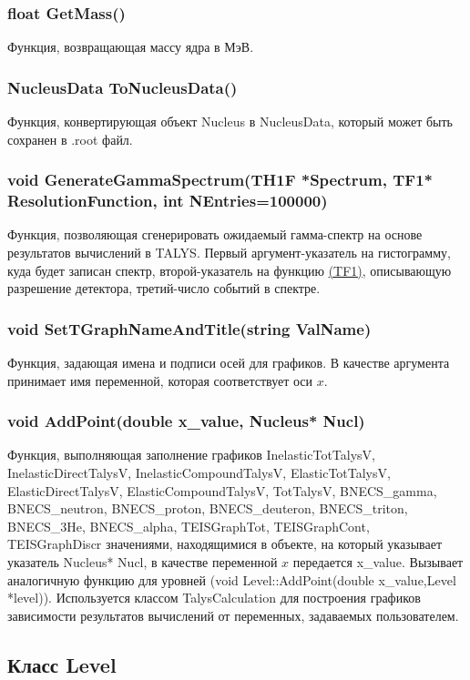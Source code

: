 \documentclass[a4paper,12pt]{extarticle}
\begin{document}
\subsubsection{float GetMass()}
Функция, возвращающая массу ядра в МэВ.
\subsubsection{NucleusData ToNucleusData()}
Функция, конвертирующая объект Nucleus в NucleusData, который может быть сохранен в .root файл.
\subsubsection{void GenerateGammaSpectrum(TH1F *Spectrum, TF1* ResolutionFunction, int NEntries=100000)}
Функция, позволяющая сгенерировать ожидаемый гамма-спектр на основе результатов вычислений в TALYS. Первый аргумент-указатель на гистограмму, куда будет записан спектр, второй-указатель на функцию \href{https://root.cern.ch/doc/master/classTF1.html}{(TF1)}, описывающую разрешение детектора, третий-число событий в спектре.
\subsubsection{void SetTGraphNameAndTitle(string ValName)}
Функция, задающая имена и подписи осей для графиков. В качестве аргумента принимает имя переменной, которая соответствует оси $x$.
\subsubsection{void AddPoint(double x_value, Nucleus* Nucl)}
Функция, выполняющая заполнение графиков InelasticTotTalysV, InelasticDirectTalysV, InelasticCompoundTalysV, ElasticTotTalysV, ElasticDirectTalysV, ElasticCompoundTalysV, TotTalysV, BNECS_gamma, BNECS_neutron, BNECS_proton, BNECS_deuteron, BNECS_triton, BNECS_3He, BNECS_alpha, TEISGraphTot, TEISGraphCont, TEISGraphDiscr значениями, находящимися в объекте, на который указывает указатель Nucleus* Nucl, в качестве переменной $x$ передается x_value. Вызывает аналогичную функцию для уровней (void Level::AddPoint(double x_value,Level *level)). Используется классом TalysCalculation для построения графиков зависимости результатов вычислений от переменных, задаваемых пользователем.
\subsection{Класс Level}
\end{document}

